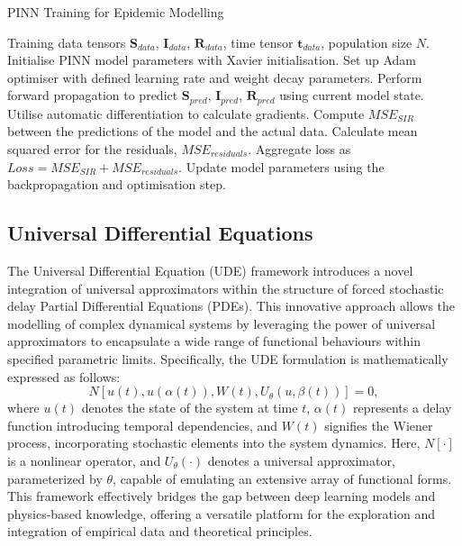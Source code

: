 \documentclass[12pt]{article}
\begin{document}
\begin{algorithm}
    \label{algo:1}
    \caption{PINN Training for Epidemic Modelling}
    \begin{algorithmic}
        \Require Training data tensors $\mathbf{S}_{data}$, $\mathbf{I}_{data}$, $\mathbf{R}_{data}$, time tensor $\mathbf{t}_{data}$, population size $N$.
        \State Initialise PINN model parameters with Xavier initialisation.
        \State Set up Adam optimiser with defined learning rate and weight decay parameters.
            \State Perform forward propagation to predict $\mathbf{S}_{pred}$, $\mathbf{I}_{pred}$, $\mathbf{R}_{pred}$ using current model state.
            \State Utilise automatic differentiation to calculate gradients.
            \State Compute $MSE_{SIR}$ between the predictions of the model and the actual data.
            \State Calculate mean squared error for the residuals, $MSE_{residuals}$.
            \State Aggregate loss as $Loss = MSE_{SIR} + MSE_{residuals}$.
            \State Update model parameters using the backpropagation and optimisation step.
        \EndFor
    \end{algorithmic}
\end{algorithm}

\subsection{Universal Differential Equations}
The Universal Differential Equation (UDE) \cite{rackauckas2020universal} framework introduces a novel integration of universal approximators within the structure of forced stochastic delay Partial Differential Equations (PDEs). This innovative approach allows the modelling of complex dynamical systems by leveraging the power of universal approximators to encapsulate a wide range of functional behaviours within specified parametric limits. Specifically, the UDE formulation is mathematically expressed as follows:
\begin{equation}
N[u(t), u(\alpha(t)), W(t), U_{\theta}(u, \beta(t))] = 0,
\end{equation}
where \(u(t)\) denotes the state of the system at time \(t\), \(\alpha(t)\) represents a delay function introducing temporal dependencies, and \(W(t)\) signifies the Wiener process, incorporating stochastic elements into the system dynamics. Here, \(N[\cdot]\) is a nonlinear operator, and \(U_{\theta}(\cdot)\) denotes a universal approximator, parameterized by \(\theta\), capable of emulating an extensive array of functional forms. This framework effectively bridges the gap between deep learning models and physics-based knowledge, offering a versatile platform for the exploration and integration of empirical data and theoretical principles.
\end{document}
